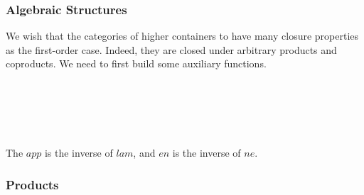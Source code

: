 \subsubsection*{Algebraic Structures}

We wish that the categories of higher containers to have many closure properties as the first-order case. Indeed, they are closed under arbitrary products and coproducts. We need to first build some auxiliary functions.

\begin{code}%
\>[0]\AgdaSpace{}%
\AgdaSymbol{:}\AgdaSpace{}%
\AgdaSpace{}%
\AgdaSpace{}%
\AgdaSymbol{(}\AgdaSpace{}%
\AgdaSpace{}%
\AgdaSymbol{)}\AgdaSpace{}%
\AgdaSpace{}%
\AgdaSpace{}%
\AgdaSymbol{(}\AgdaSpace{}%
\AgdaSpace{}%
\AgdaSymbol{)}\AgdaSpace{}%
\<%
\\
\>[0]\AgdaSpace{}%
\AgdaSymbol{(}\AgdaSpace{}%
\AgdaSymbol{)}\AgdaSpace{}%
\AgdaSymbol{=}\AgdaSpace{}%
\<%
\\
%
\\[\AgdaEmptyExtraSkip]%
\>[0]\AgdaSpace{}%
\AgdaSymbol{:}\AgdaSpace{}%
\AgdaSpace{}%
\AgdaSpace{}%
\AgdaInductiveConstructor{*}\AgdaSpace{}%
\AgdaSpace{}%
\AgdaSpace{}%
\AgdaSpace{}%
\AgdaInductiveConstructor{*}\<%
\\
\>[0]\AgdaSpace{}%
\AgdaSymbol{(}\AgdaSpace{}%
\AgdaSymbol{)}\AgdaSpace{}%
\AgdaSymbol{=}\AgdaSpace{}%
\<%
\end{code}

The $app$ is the inverse of $lam$, and $en$ is the inverse of $ne$.

\subsubsection*{Products}


